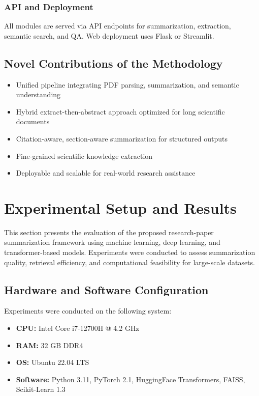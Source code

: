 \documentclass[conference]{IEEEtran}
\begin{document}
\subsubsection{API and Deployment}
All modules are served via API endpoints for summarization, extraction, semantic search, and QA. Web deployment uses Flask or Streamlit.

\subsection{Novel Contributions of the Methodology}

\begin{itemize}
    \item Unified pipeline integrating PDF parsing, summarization, and semantic understanding
    \item Hybrid extract-then-abstract approach optimized for long scientific documents
    \item Citation-aware, section-aware summarization for structured outputs
    \item Fine-grained scientific knowledge extraction
    \item Deployable and scalable for real-world research assistance
\end{itemize}

\section{Experimental Setup and Results}

This section presents the evaluation of the proposed research-paper summarization framework using machine learning, deep learning, and transformer-based models. Experiments were conducted to assess summarization quality, retrieval efficiency, and computational feasibility for large-scale datasets.

\subsection{Hardware and Software Configuration}

Experiments were conducted on the following system:

\begin{itemize}
    \item \textbf{CPU:} Intel Core i7-12700H @ 4.2 GHz
    \item \textbf{RAM:} 32 GB DDR4
    \item \textbf{OS:} Ubuntu 22.04 LTS
    \item \textbf{Software:} Python 3.11, PyTorch 2.1, HuggingFace Transformers, FAISS, Scikit-Learn 1.3
\end{itemize}
\end{document}
